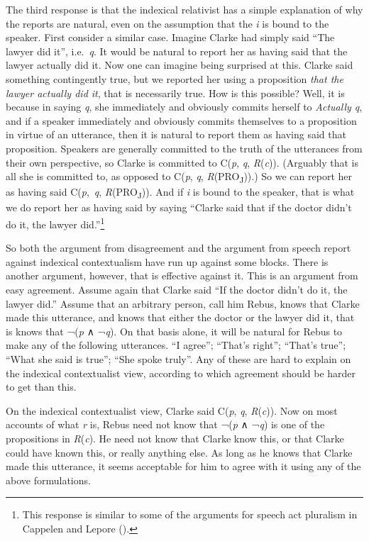 \documentclass[
  11pt,
  letterpaper,
  DIV=11,
  numbers=noendperiod,
  twoside]{scrartcl}
\begin{document}
The third response is that the indexical relativist has a simple
explanation of why the reports are natural, even on the assumption that
the \emph{i} is bound to the speaker. First consider a similar case.
Imagine Clarke had simply said ``The lawyer did it'', i.e.~\emph{q}. It
would be natural to report her as having said that the lawyer actually
did it. Now one can imagine being surprised at this. Clarke said
something contingently true, but we reported her using a proposition
\emph{that the lawyer actually did it}, that is necessarily true. How is
this possible? Well, it is because in saying \emph{q}, she immediately
and obviously commits herself to \emph{Actually q}, and if a speaker
immediately and obviously commits themselves to a proposition in virtue
of an utterance, then it is natural to report them as having said that
proposition. Speakers are generally committed to the truth of the
utterances from their own perspective, so Clarke is committed to
C(\emph{p}, \emph{q}, \emph{R}(\emph{c})). (Arguably that is all she is
committed to, as opposed to C(\emph{p}, \emph{q},
\emph{R}(PRO\textsubscript{J})).) So we can report her as having said
C(\emph{p},~\emph{q}, \emph{R}(PRO\textsubscript{J})). And if \emph{i}
is bound to the speaker, that is what we do report her as having said by
saying ``Clarke said that if the doctor didn't do it, the lawyer
did.''\footnote{This response is similar to some of the arguments for
  speech act pluralism in Cappelen and Lepore
  ().}

So both the argument from disagreement and the argument from speech
report against indexical contextualism have run up against some blocks.
There is another argument, however, that is effective against it. This
is an argument from easy agreement. Assume again that Clarke said ``If
the doctor didn't do it, the lawyer did.'' Assume that an arbitrary
person, call him Rebus, knows that Clarke made this utterance, and knows
that either the doctor or the lawyer did it, that is knows that
¬(\emph{p} ∧ ¬\emph{q}). On that basis alone, it will be natural for
Rebus to make any of the following utterances. ``I agree''; ``That's
right''; ``That's true''; ``What she said is true''; ``She spoke
truly''. Any of these are hard to explain on the indexical contextualist
view, according to which agreement should be harder to get than this.

On the indexical contextualist view, Clarke said C(\emph{p}, \emph{q},
\emph{R}(\emph{c})). Now on most accounts of what \emph{r} is, Rebus
need not know that ¬(\emph{p} ∧ ¬\emph{q}) is one of the propositions in
\emph{R}(\emph{c}). He need not know that Clarke know this, or that
Clarke could have known this, or really anything else. As long as he
knows that Clarke made this utterance, it seems acceptable for him to
agree with it using any of the above formulations.
\end{document}
